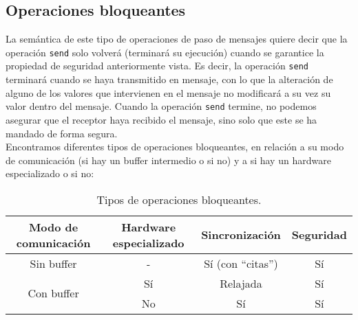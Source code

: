 \subsection{Operaciones bloqueantes}
La semántica de este tipo de operaciones de paso de mensajes quiere decir que la operación \verb|send| solo volverá (terminará su ejecución) cuando se garantice la propiedad de seguridad anteriormente vista. Es decir, la operación \verb|send| terminará cuando se haya transmitido en mensaje, con lo que la alteración de alguno de los valores que intervienen en el mensaje no modificará a su vez su valor dentro del mensaje. Cuando la operación \verb|send| termine, no podemos asegurar que el receptor haya recibido el mensaje, sino solo que este se ha mandado de forma segura.\\

Encontramos diferentes tipos de operaciones bloqueantes, en relación a su modo de comunicación (si hay un buffer intermedio o si no) y a si hay un hardware especializado o si no:
\begin{table}[H]
\centering
\begin{tabular}{|c|c|c|c|}
    \hline
    Modo de comunicación & Hardware especializado & Sincronización & Seguridad \\
    \hline
    Sin buffer & - & Sí (con ``citas'') & Sí \\
    \hline
    \multirow{2}{*}{Con buffer} & Sí & Relajada & Sí \\
    \cline{2-4}
    & No & Sí & Sí \\
    \hline
\end{tabular}
\caption{Tipos de operaciones bloqueantes.}
\end{table}


